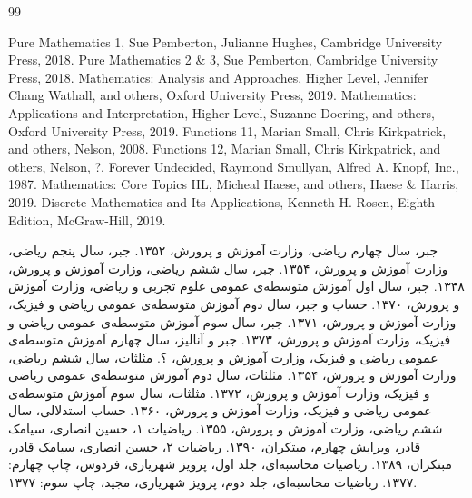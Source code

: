 \cleardoublepage
{}

\renewcommand{\bibname}{مراجع}
\begin{thebibliography}{99}
	\begin{LTRbibitems}
		\resetlatinfont
		Pure Mathematics 1, Sue Pemberton, Julianne Hughes, Cambridge University Press, 2018.
		Pure Mathematics 2 \& 3, Sue Pemberton, Cambridge University Press, 2018.
		Mathematics: Analysis and Approaches, Higher Level, Jennifer Chang Wathall, and others, Oxford University Press, 2019.
		Mathematics: Applications and Interpretation, Higher Level, Suzanne Doering, and others, Oxford University Press, 2019.
		Functions 11, Marian Small, Chris Kirkpatrick, and others, Nelson, 2008.
		Functions 12, Marian Small, Chris Kirkpatrick, and others, Nelson, ?.
		Forever Undecided, Raymond Smullyan, Alfred A. Knopf, Inc., 1987.
		Mathematics: Core Topics HL, Micheal Haese, and others, Haese \& Harris, 2019.
		Discrete Mathematics and Its Applications, Kenneth H. Rosen, Eighth Edition, McGraw-Hill, 2019.
	\end{LTRbibitems}
	جبر، سال چهارم ریاضی، وزارت آموزش و پرورش، ۱۳۵۲.
	جبر، سال پنجم ریاضی، وزارت آموزش و پرورش، ۱۳۵۴.
	جبر، سال ششم ریاضی، وزارت آموزش و پرورش، ۱۳۴۸.
	جبر، سال اول آموزش متوسطه‌ی عمومی علوم تجربی و ریاضی، وزارت آموزش و پرورش، ۱۳۷۰.
	حساب و جبر، سال دوم آموزش متوسطه‌ی عمومی ریاضی و فیزیک، وزارت آموزش و پرورش، ۱۳۷۱.
	جبر، سال سوم آموزش متوسطه‌ی عمومی ریاضی و فیزیک، وزارت آموزش و پرورش، ۱۳۷۳.
	جبر و آنالیز، سال چهارم آموزش متوسطه‌ی عمومی ریاضی و فیزیک، وزارت آموزش و پرورش، ؟.
	مثلثات، سال ششم ریاضی، وزارت آموزش و پرورش، ۱۳۵۴.
	مثلثات، سال دوم آموزش متوسطه‌ی عمومی ریاضی و فیزیک، وزارت آموزش و پرورش، ۱۳۷۲.
	مثلثات، سال سوم آموزش متوسطه‌ی عمومی ریاضی و فیزیک، وزارت آموزش و پرورش، ۱۳۶۰.
	حساب استدلالی، سال ششم ریاضی، وزارت آموزش و پرورش، ۱۳۵۵.
	ریاضیات ۱، حسین انصاری، سیامک قادر، ویرایش چهارم، مبتکران، ۱۳۹۰.
	ریاضیات ۲، حسین انصاری، سیامک قادر، مبتکران، ۱۳۸۹.
	ریاضیات محاسبه‌ای، جلد اول، پرویز شهریاری، فردوس، چاپ چهارم: ۱۳۷۷.
	ریاضیات محاسبه‌ای، جلد دوم، پرویز شهریاری، مجید، چاپ سوم: ۱۳۷۷.

\end{thebibliography}
